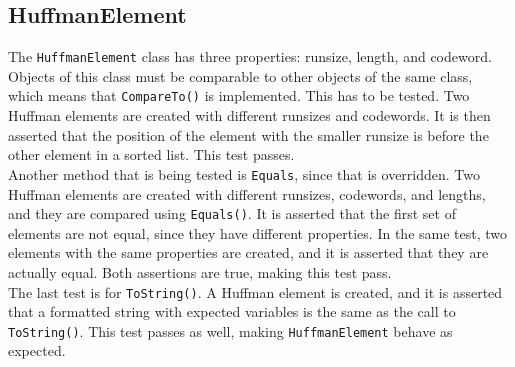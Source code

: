 \subsection*{HuffmanElement}
The \lstinline|HuffmanElement| class has three properties: runsize, length, and codeword.
Objects of this class must be comparable to other objects of the same class, which means that \lstinline|CompareTo()| is implemented.
This has to be tested.
Two Huffman elements are created with different runsizes and codewords.
It is then asserted that the position of the element with the smaller runsize is before the other element in a sorted list.
This test passes.\\
Another method that is being tested is \lstinline|Equals|, since that is overridden.
Two Huffman elements are created with different runsizes, codewords, and lengths, and they are compared using \lstinline|Equals()|.
It is asserted that the first set of elements are not equal, since they have different properties.
In the same test, two elements with the same properties are created, and it is asserted that they are actually equal.
Both assertions are true, making this test pass.\\
The last test is for \lstinline|ToString()|.
A Huffman element is created, and it is asserted that a formatted string with expected variables is the same as the call to \lstinline|ToString()|.
This test passes as well, making \lstinline|HuffmanElement| behave as expected.

